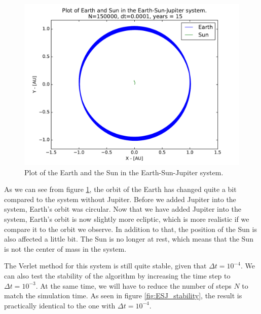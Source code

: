 \documentclass[12pt]{article}
\begin{document}
\begin{figure}[!h]
\centering
\includegraphics[width=\linewidth]{Plots/ESJ_EarthandSun.pdf}
\caption{Plot of the Earth and the Sun in the Earth-Sun-Jupiter system.}
\label{fig:EJS_Earth_and_sun}
\end{figure}

As we can see from figure \ref{fig:EJS_Earth_and_sun}, the orbit of the Earth has changed quite a bit compared to the system without Jupiter. Before we added Jupiter into the system, Earth's orbit was circular. Now that we have added Jupiter into the system, Earth's orbit is now slightly more ecliptic, which is more realistic if we compare it to the orbit we observe. In addition to that, the position of the Sun is also affected a little bit. The Sun is no longer at rest, which means that the Sun is not the center of mass in the system.

The Verlet method for this system is still quite stable, given that $\Delta t = 10^{-4}$. We can also test the stability of the algorithm by increasing the time step to $\Delta t = 10^{-3}$. At the same time, we will have to reduce the number of steps $N$ to match the simulation time. As seen in figure \ref{fig:ESJ_stability}, the result is practically identical to the one with $\Delta t = 10^{-4}$.
\end{document}
